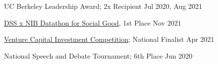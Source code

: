 UC Berkeley Leadership Award; 2x Recipient \hfill Jul 2020, Aug 2021 \par
\href{https://www.facebook.com/events/933047190947185?}{DSS x NIB Datathon for Social Good}, 1st Place \hfill Nov 2021\par
\href{https://www.vcic.org/}{Venture Capital Investment Competition}; National Finalist \hfill Apr 2021\par
National Speech and Debate Tournament; 6th Place \hfill Jun 2020 \par